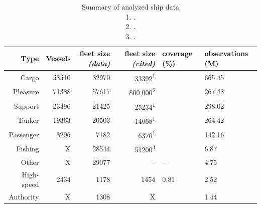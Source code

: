 

\begin{table}[htbp]
  \begin{tabular}{rrrrll} %
    \hline
    Type & Vessels & fleet size \textit{(data)} & fleet size \textit{(cited)} & coverage (\%) & observations (M) \\
    \hline
    Cargo & 58510 & 32970 & 33392\textsuperscript{1} & & 665.45 \\
    Pleasure & 71388 & 57617 & ~800,000\textsuperscript{2} & & 267.48 \\
    Support & 23496 & 21425 & 25234\textsuperscript{1} & & 298.02 \\
    Tanker & 19363 & 20503 & 14068\textsuperscript{1} & & 264.42 \\
    Passenger & 8296 & 7182 & 6370\textsuperscript{1} & & 142.16 \\
    Fishing & X & 28544 & 51200\textsuperscript{3} & & 6.87 \\
    Other & X & 29077 & -- & -- & 4.75 \\
    High-speed & 2434 & 1178 & 1454 & 0.81 & 2.52 \\
    Authority & X & 1308 & X & & 1.44 \\
  \end{tabular}
  \caption{Summary of analyzed ship data\\
  1. \cite{Equasis2011}.\\
  2. \cite{westwood2001global}.\\
  3. \cite{FAOfishing}.}
  \label{table:ships-by-type}
\end{table}


